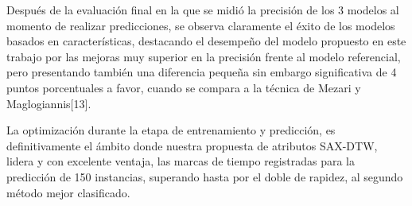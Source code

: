 \hfill\break
\justifying
Después de la evaluación final en la que se midió la precisión de los 3 modelos al momento de realizar predicciones, se observa claramente el éxito de los modelos basados en características, destacando el desempeño del modelo propuesto en este trabajo por las mejoras muy superior en la precisión frente al modelo referencial, pero presentando también una diferencia pequeña sin embargo significativa de 4 puntos porcentuales a favor, cuando se compara a la técnica de Mezari y Maglogiannis[13].

\hfill\break
\justifying
La optimización durante la etapa de entrenamiento y predicción, es definitivamente el ámbito donde nuestra propuesta de atributos SAX-DTW, lidera y con excelente ventaja, las marcas de tiempo registradas para la predicción de 150 instancias, superando hasta por el doble de rapidez, al segundo método mejor clasificado.